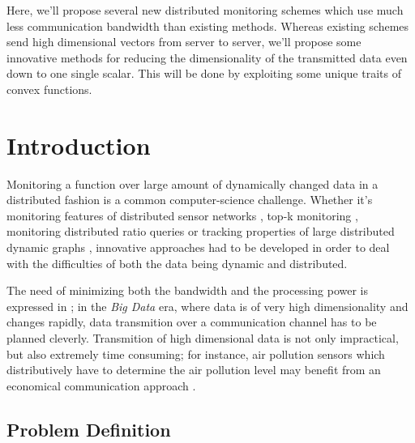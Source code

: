 \documentclass[11pt, conference]{article}
\begin{document}
Here, we'll propose several new distributed monitoring schemes which use much less communication bandwidth than existing methods. Whereas existing schemes send high dimensional vectors from server to server, we'll propose some innovative methods for reducing the dimensionality of the transmitted data even down to one single scalar. This will be done by exploiting some unique traits of convex functions.

\section{Introduction}

Monitoring a function over large amount of dynamically changed data in a distributed fashion is a common computer-science challenge. Whether it's monitoring features of distributed sensor networks \cite{burdakis2012detecting}, top-k monitoring \cite{babcock2003distributed}, monitoring distributed ratio queries \cite{gupta2013ratio} or tracking properties of large distributed dynamic graphs \cite{mcgregor2015densest}, innovative approaches had to be developed in order to deal with the difficulties of both the data being dynamic and distributed.

The need of minimizing both the bandwidth and the processing power is expressed in \cite{giatrakos2013network}; in the \textit{Big Data} era, where data is of very high dimensionality and changes rapidly, data transmition over a communication channel has to be planned cleverly. Transmition of high dimensional data is not only impractical, but also extremely time consuming; for instance, air pollution sensors which distributively have to determine the air pollution level may benefit from an economical communication approach \cite{cheng2004revised}.

\subsection{Problem Definition}
\end{document}

